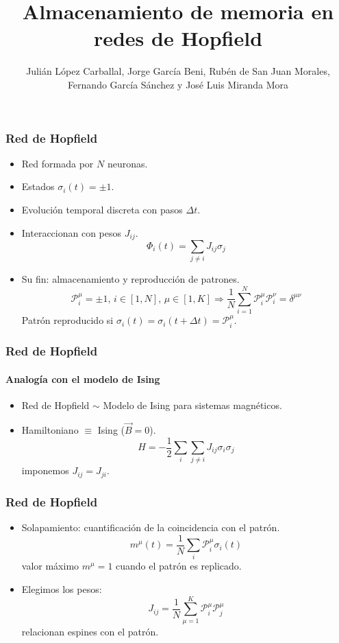 \documentclass[11pt]{beamer}
\title{Almacenamiento de memoria en redes de Hopfield}
\author{Julián López Carballal, Jorge García Beni, Rubén de San Juan Morales, Fernando García Sánchez y José Luis Miranda Mora}
\date{\vspace{0cm}}
\begin{document}
	
\frame{\titlepage}

\begin{frame}
\frametitle{Red de Hopfield}
\begin{itemize}
	\item Red formada por $N$ neuronas.
	\item Estados $\sigma_i(t)=\pm 1$.
	\item Evolución temporal discreta con pasos $\Delta t$.
	\item Interaccionan con pesos $J_{ij}$.
	\begin{displaymath}
	\Phi_i(t)=\sum_{j\neq i} J_{ij}\sigma_j
	\end{displaymath}
	\item Su fin: almacenamiento y reproducción de patrones.
	\begin{displaymath}
	\mathcal{P}^\mu_i = \pm1, \,i \in[1,N],\,\mu\in[1,K]\Rightarrow\frac{1}{N}\sum_{i=1}^N \mathcal{P}^\mu_i \mathcal{P}^\nu_i = \delta^{\mu\nu}
	\end{displaymath}
	Patrón reproducido si $\sigma_i(t)=\sigma_i(t+\Delta t)=\mathcal{P}^\mu_i$.
\end{itemize}
\end{frame}

\begin{frame}
\frametitle{Red de Hopfield}
\framesubtitle{Analogía con el modelo de Ising}
\begin{itemize}
	\item Red de Hopfield $\sim$ Modelo de Ising para sistemas magnéticos.
	\item Hamiltoniano $\equiv$ Ising ($\vec{B}=0$).
	\begin{displaymath}
	H = -\frac{1}{2}\sum_{i}\sum_{j\neq i}J_{ij}\sigma_i\sigma_j
	\end{displaymath}
	imponemos $J_{ij}=J_{ji}$.
\end{itemize}
\end{frame}

\begin{frame}
\frametitle{Red de Hopfield}
\begin{itemize}
	\item Solapamiento: cuantificación de la coincidencia con el patrón.
	\begin{displaymath}
	m^\mu(t)=\frac{1}{N}\sum_i \mathcal{P}^\mu_i\sigma_i(t)
	\label{overlap}
	\end{displaymath}
	valor máximo $m^\mu=1$ cuando el patrón es replicado.
	\item Elegimos los pesos:
	\begin{displaymath}
	J_{ij}=\frac{1}{N}\sum_{\mu=1}^K \mathcal{P}^\mu_i \mathcal{P}^\mu_j
	\end{displaymath}
	relacionan espines con el patrón.
\end{itemize}
\end{frame}
\end{document}
